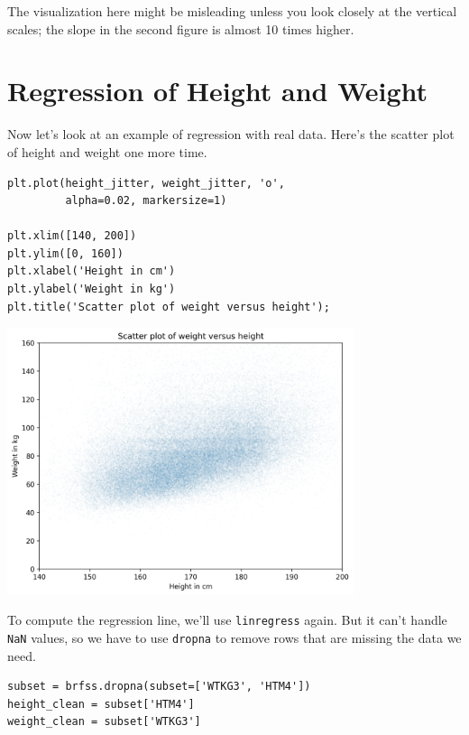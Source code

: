 The visualization here might be misleading unless you look closely at
the vertical scales; the slope in the second figure is almost 10 times
higher.

\hypertarget{regression-of-height-and-weight}{%
\section{Regression of Height and
Weight}\label{regression-of-height-and-weight}}

Now let's look at an example of regression with real data. Here's the
scatter plot of height and weight one more time.

\begin{lstlisting}[]
plt.plot(height_jitter, weight_jitter, 'o', 
         alpha=0.02, markersize=1)

plt.xlim([140, 200])
plt.ylim([0, 160])
plt.xlabel('Height in cm')
plt.ylabel('Weight in kg')
plt.title('Scatter plot of weight versus height');
\end{lstlisting}

\begin{center}
\includegraphics[width=4in]{chapters/09_relationships_files/09_relationships_92_0.png}
\end{center}

To compute the regression line, we'll use
\passthrough{\lstinline!linregress!} again. But it can't handle
\passthrough{\lstinline!NaN!} values, so we have to use
\passthrough{\lstinline!dropna!} to remove rows that are missing the
data we need.

\begin{lstlisting}[]
subset = brfss.dropna(subset=['WTKG3', 'HTM4'])
height_clean = subset['HTM4']
weight_clean = subset['WTKG3']
\end{lstlisting}

